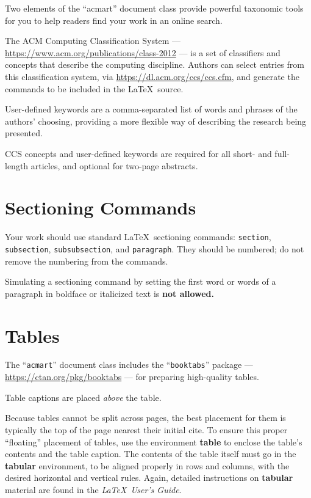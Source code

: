 \documentclass[acmlarge,11pt]{acmart}
\begin{document}
Two elements of the ``acmart'' document class provide powerful
taxonomic tools for you to help readers find your work in an online
search.

The ACM Computing Classification System ---
\url{https://www.acm.org/publications/class-2012} --- is a set of
classifiers and concepts that describe the computing
discipline. Authors can select entries from this classification
system, via \url{https://dl.acm.org/ccs/ccs.cfm}, and generate the
commands to be included in the \LaTeX\ source.

User-defined keywords are a comma-separated list of words and phrases
of the authors' choosing, providing a more flexible way of describing
the research being presented.

CCS concepts and user-defined keywords are required for all short- and
full-length articles, and optional for two-page abstracts.

\section{Sectioning Commands}

Your work should use standard \LaTeX\ sectioning commands:
\verb|section|, \verb|subsection|, \verb|subsubsection|, and
\verb|paragraph|. They should be numbered; do not remove the numbering
from the commands.

Simulating a sectioning command by setting the first word or words of
a paragraph in boldface or italicized text is {\bfseries not allowed.}

\section{Tables}

The ``\verb|acmart|'' document class includes the ``\verb|booktabs|''
package --- \url{https://ctan.org/pkg/booktabs} --- for preparing
high-quality tables.

Table captions are placed {\itshape above} the table.

Because tables cannot be split across pages, the best placement for
them is typically the top of the page nearest their initial cite.  To
ensure this proper ``floating'' placement of tables, use the
environment \textbf{table} to enclose the table's contents and the
table caption.  The contents of the table itself must go in the
\textbf{tabular} environment, to be aligned properly in rows and
columns, with the desired horizontal and vertical rules.  Again,
detailed instructions on \textbf{tabular} material are found in the
\textit{\LaTeX\ User's Guide}.
\end{document}

